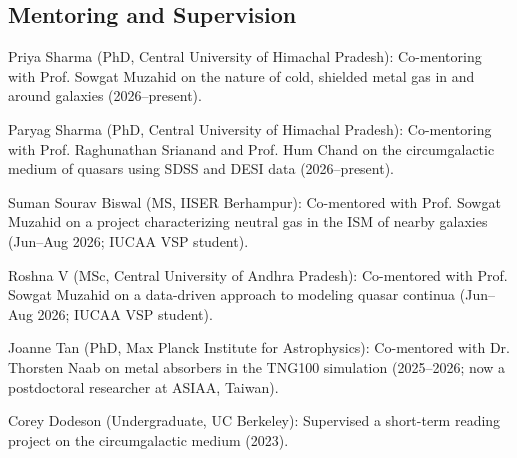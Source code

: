 \documentclass[11pt,letterpaper]{article}
\begin{document}
\subsection{Mentoring and Supervision}
\begin{list}{}{\cvlist}

\item Priya Sharma (PhD, Central University of Himachal Pradesh): Co-mentoring with Prof. Sowgat Muzahid on the nature of cold, shielded metal gas in and around galaxies (2026--present).

\item Paryag Sharma (PhD, Central University of Himachal Pradesh): Co-mentoring with Prof. Raghunathan Srianand and Prof. Hum Chand on the circumgalactic medium of quasars using SDSS and DESI data (2026--present).

\item Suman Sourav Biswal (MS, IISER Berhampur): Co-mentored with Prof. Sowgat Muzahid on a project characterizing neutral gas in the ISM of nearby galaxies (Jun--Aug 2026; IUCAA VSP student).

\item Roshna V (MSc, Central University of Andhra Pradesh): Co-mentored with Prof. Sowgat Muzahid on a data-driven approach to modeling quasar continua (Jun--Aug 2026; IUCAA VSP student).


\item Joanne Tan (PhD, Max Planck Institute for Astrophysics): Co-mentored with Dr. Thorsten Naab on metal absorbers in the TNG100 simulation (2025--2026; now a postdoctoral researcher at ASIAA, Taiwan).

\item Corey Dodeson (Undergraduate, UC Berkeley): Supervised a short-term reading project on the circumgalactic medium (2023).
\end{list}

\vspace{-1.5mm}
\end{document}
